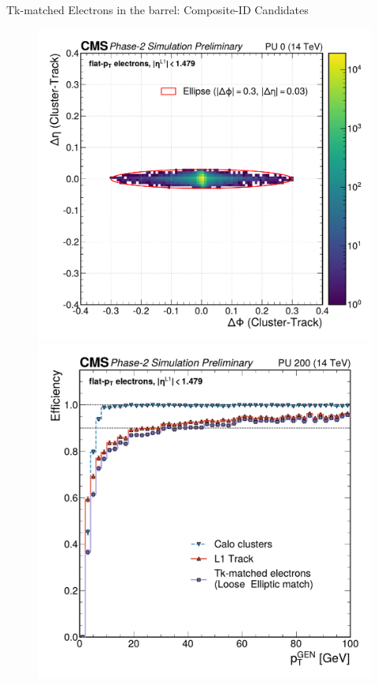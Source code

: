 \documentclass[aspectratio=169]{beamer}\usepackage[utf8]{inputenc}
\begin{document}
\begin{frame}{Tk-matched Electrons in the barrel: Composite-ID Candidates}

    

    


\begin{figure}
\centering
    \includegraphics[height=0.42\textheight,trim={0 2cm 0 2.2cm}]{barrel_figs/slides17/etaphi.pdf}
    \includegraphics[height=0.42\textheight,trim={0 2cm 0 2.2cm}]{barrel_figs/slides17/pteff.pdf}
\end{figure}


\end{frame}
\end{document}
